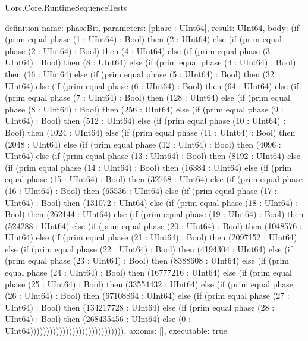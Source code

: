 \begin{lexlean}{Uorc.Core.RuntimeSequenceTests}
\begin{semanticmodule}
definition{
  name: phaseBit,
  parameters: [phase : UInt64],
  result: UInt64,
  body: (if (prim equal phase (1 : UInt64) : Bool) then (2 : UInt64) else (if (prim equal phase (2 : UInt64) : Bool) then (4 : UInt64) else (if (prim equal phase (3 : UInt64) : Bool) then (8 : UInt64) else (if (prim equal phase (4 : UInt64) : Bool) then (16 : UInt64) else (if (prim equal phase (5 : UInt64) : Bool) then (32 : UInt64) else (if (prim equal phase (6 : UInt64) : Bool) then (64 : UInt64) else (if (prim equal phase (7 : UInt64) : Bool) then (128 : UInt64) else (if (prim equal phase (8 : UInt64) : Bool) then (256 : UInt64) else (if (prim equal phase (9 : UInt64) : Bool) then (512 : UInt64) else (if (prim equal phase (10 : UInt64) : Bool) then (1024 : UInt64) else (if (prim equal phase (11 : UInt64) : Bool) then (2048 : UInt64) else (if (prim equal phase (12 : UInt64) : Bool) then (4096 : UInt64) else (if (prim equal phase (13 : UInt64) : Bool) then (8192 : UInt64) else (if (prim equal phase (14 : UInt64) : Bool) then (16384 : UInt64) else (if (prim equal phase (15 : UInt64) : Bool) then (32768 : UInt64) else (if (prim equal phase (16 : UInt64) : Bool) then (65536 : UInt64) else (if (prim equal phase (17 : UInt64) : Bool) then (131072 : UInt64) else (if (prim equal phase (18 : UInt64) : Bool) then (262144 : UInt64) else (if (prim equal phase (19 : UInt64) : Bool) then (524288 : UInt64) else (if (prim equal phase (20 : UInt64) : Bool) then (1048576 : UInt64) else (if (prim equal phase (21 : UInt64) : Bool) then (2097152 : UInt64) else (if (prim equal phase (22 : UInt64) : Bool) then (4194304 : UInt64) else (if (prim equal phase (23 : UInt64) : Bool) then (8388608 : UInt64) else (if (prim equal phase (24 : UInt64) : Bool) then (16777216 : UInt64) else (if (prim equal phase (25 : UInt64) : Bool) then (33554432 : UInt64) else (if (prim equal phase (26 : UInt64) : Bool) then (67108864 : UInt64) else (if (prim equal phase (27 : UInt64) : Bool) then (134217728 : UInt64) else (if (prim equal phase (28 : UInt64) : Bool) then (268435456 : UInt64) else (0 : UInt64))))))))))))))))))))))))))))),
  axioms: [],
  executable: true
}


\end{semanticmodule}
\end{lexlean}

